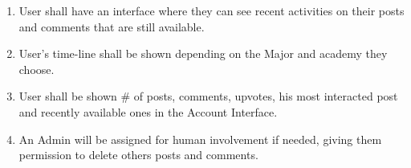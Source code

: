 \documentclass[12pt]{article}
\begin{document}
\begin{enumerate}
\item User shall have an interface where they can see recent activities on their posts and comments that are still available.
\item User's time-line shall be shown depending on the Major and academy they choose.
\item User shall be shown \# of posts, comments, upvotes, his most interacted post and recently available ones in the Account Interface.
\item An Admin will be assigned for human involvement if needed, giving them permission to delete others posts and comments.
\end{enumerate}



\end{document}
